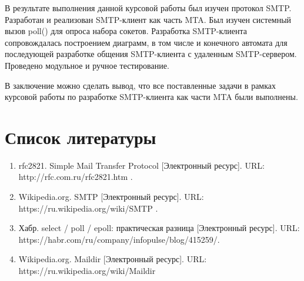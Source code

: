 \documentclass[a4paper,12pt]{report}
\begin{document}
	В результате выполнения данной курсовой работы был изучен протокол SMTP. 
	Разработан и реализован SMTP-клиент как часть MTA. 
	Был изучен системный вызов poll() для опроса набора сокетов. 
	 Разработка SMTP-клиента сопровождалась построением диаграмм,
	  в том числе и конечного автомата для последующей разработке 
	  общения SMTP-клиента с удаленным SMTP-сервером. 
	  Проведено модульное и ручное тестирование.
	
	В заключение можно сделать вывод, что все поставленные задачи в рамках курсовой работы по 
	разработке SMTP-клиента как части MTA были выполнены.


	\chapter{Список литературы}

	\begin{enumerate}
		\item rfc2821. Simple Mail Transfer Protocol [Электронный ресурс]. URL: http://rfc.com.ru/rfc2821.htm .
		\item Wikipedia.org. SMTP [Электронный ресурс]. URL: https://ru.wikipedia.org/wiki/SMTP .
		\item Хабр. select / poll / epoll: практическая разница [Электронный ресурс]. URL: https://habr.com/ru/company/infopulse/blog/415259/.
		\item Wikipedia.org. Maildir [Электронный ресурс]. URL: https://ru.wikipedia.org/wiki/Maildir
	\end{enumerate}
	
\end{document}
